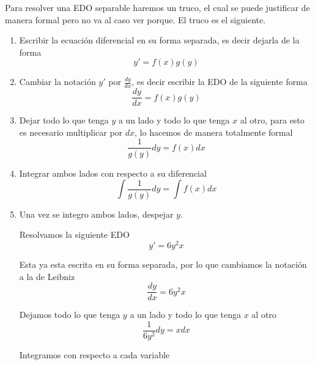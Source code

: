 \documentclass[a4paper,oneside,10.5pt]{article}
\begin{document}
Para resolver una EDO separable haremos un truco, el cual se puede justificar de manera formal pero no va al caso ver porque. El truco es el siguiente.

\begin{enumerate}
  \item Escribir la ecuación diferencial en su forma separada, es decir dejarla de la forma
        \begin{equation*}
          y' = f(x)g(y)
        \end{equation*}
  \item Cambiar la notación $y'$ por $\frac{dy}{dx}$, es decir escribir la EDO de la siguiente forma
        \begin{equation*}
          \frac{dy}{dx} = f(x) g(y)
        \end{equation*}

  \item Dejar todo lo que tenga $y$ a un lado y todo lo que tenga $x$ al otro, para esto es necesario multiplicar por $dx$, lo hacemos de manera totalmente formal
        \begin{equation*}
          \frac{1}{g(y)} dy = f(x) dx
        \end{equation*}

  \item Integrar ambos lados con respecto a su diferencial
        \begin{equation*}
          \int \frac{1}{g(y)} dy = \int f(x) dx
        \end{equation*}
  \item Una vez se integro ambos lados, despejar $y$.

  \begin{ejemplo}
    Resolvamos la siguiente EDO
    \begin{equation*}
      y' = 6y^{2}x
    \end{equation*}

    Esta ya esta escrita en su forma separada, por lo que cambiamos la notación a la de Leibniz
    \begin{equation*}
      \frac{dy}{dx} = 6y^{2}x
    \end{equation*}

    Dejamos todo lo que tenga $y$ a un lado y todo lo que tenga $x$ al otro
    \begin{equation*}
      \frac{1}{6y^{2}} dy = x dx
    \end{equation*}

    Integramos con respecto a cada variable


\end{ejemplo}
\end{enumerate}
\end{document}
